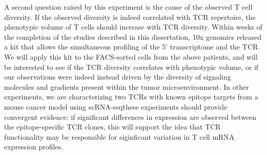 A second question raised by this experiment is the cause of the observed T cell diversity. 
If the observed diversity is indeed correlated with TCR repertoire, the phenotypic volume of T cells should increase with TCR diversity. 
Within weeks of the completion of the studies described in this dissertation, 10x genomics released a kit that allows the simultaneous profiling of the 5' transcriptome and the TCR\@.
We will apply this kit to the FACS-sorted cells from the above patients, and will be interested to see if the TCR diversity correlates with phenotypic volume, or if our observations were indeed instead driven by the diversity of signaling molecules and gradients present within the tumor microenvironment. 
In other experiments, we are characterizing two TCRs with known epitope targets from a mouse cancer model using scRNA-seq\. these experiments should provide convergent evidence: if significant differences in expression are observed between the epitope-specific TCR clones, this will support the idea that TCR functionality may be responsible for siginficant variation in T cell mRNA expression profiles. 

